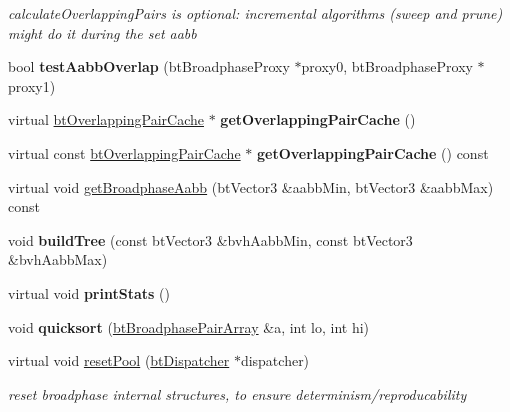 \begin{DoxyCompactItemize}
\begin{DoxyCompactList}\small\item\em calculate\+Overlapping\+Pairs is optional\+: incremental algorithms (sweep and prune) might do it during the set aabb \end{DoxyCompactList}\item 
\mbox{\label{classbtMultiSapBroadphase_a38bcbcf1378407f7c748d24cc276f3b1}} 
bool {\bfseries test\+Aabb\+Overlap} (bt\+Broadphase\+Proxy $\ast$proxy0, bt\+Broadphase\+Proxy $\ast$proxy1)
\item 
\mbox{\label{classbtMultiSapBroadphase_a081272661ef30baa9942de6ce385465e}} 
virtual \hyperlink{classbtOverlappingPairCache}{bt\+Overlapping\+Pair\+Cache} $\ast$ {\bfseries get\+Overlapping\+Pair\+Cache} ()
\item 
\mbox{\label{classbtMultiSapBroadphase_a227731d8131a9bdb12b10c02232cc162}} 
virtual const \hyperlink{classbtOverlappingPairCache}{bt\+Overlapping\+Pair\+Cache} $\ast$ {\bfseries get\+Overlapping\+Pair\+Cache} () const
\item 
virtual void \hyperlink{classbtMultiSapBroadphase_a37a11b7ee2889d80adaf5add6fffe782}{get\+Broadphase\+Aabb} (bt\+Vector3 \&aabb\+Min, bt\+Vector3 \&aabb\+Max) const
\item 
\mbox{\label{classbtMultiSapBroadphase_a2ab67fb07b7e1d4af1fbd46458bc7710}} 
void {\bfseries build\+Tree} (const bt\+Vector3 \&bvh\+Aabb\+Min, const bt\+Vector3 \&bvh\+Aabb\+Max)
\item 
\mbox{\label{classbtMultiSapBroadphase_ab63302df679c2b4ca4e2c501f15e4b51}} 
virtual void {\bfseries print\+Stats} ()
\item 
\mbox{\label{classbtMultiSapBroadphase_a873d57f7b14c9dcb773007e07510a3a3}} 
void {\bfseries quicksort} (\hyperlink{classbtAlignedObjectArray}{bt\+Broadphase\+Pair\+Array} \&a, int lo, int hi)
\item 
\mbox{\label{classbtMultiSapBroadphase_a548dd8f1c57c9025e648be0a7fe8b56d}} 
virtual void \hyperlink{classbtMultiSapBroadphase_a548dd8f1c57c9025e648be0a7fe8b56d}{reset\+Pool} (\hyperlink{classbtDispatcher}{bt\+Dispatcher} $\ast$dispatcher)
\begin{DoxyCompactList}\small\item\em reset broadphase internal structures, to ensure determinism/reproducability \end{DoxyCompactList}\end{DoxyCompactItemize}
